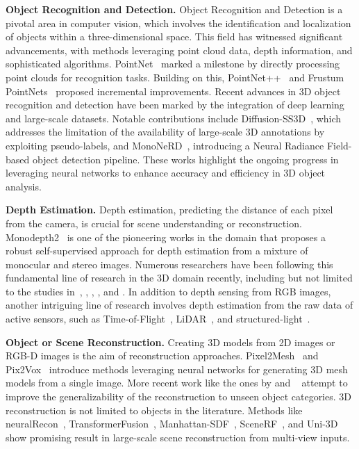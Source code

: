 \vspace{1ex}
\noindent\textbf{Object Recognition and Detection.} Object Recognition and Detection is a pivotal area in computer vision, which involves the identification and localization of objects within a three-dimensional space. This field has witnessed significant advancements, with methods leveraging point cloud data, depth information, and sophisticated algorithms. PointNet~\citep{qi2017pointnet} marked a milestone by directly processing point clouds for recognition tasks. Building on this, PointNet++~\citep{qi2017pointnet++} and Frustum PointNets~\citep{qi2018frustum} proposed incremental improvements. Recent advances in 3D object recognition and detection have been marked by the integration of deep learning and large-scale datasets. Notable contributions include Diffusion-SS3D~\citep{ho2023diffusion}, which addresses the limitation of the availability of large-scale 3D annotations by exploiting pseudo-labels, and MonoNeRD~\citep{xu2023mononerd}, introducing a Neural Radiance Field-based object detection pipeline. These works highlight the ongoing progress in leveraging neural networks to enhance accuracy and efficiency in 3D object analysis.

\vspace{1ex}
\noindent\textbf{Depth Estimation.} Depth estimation, predicting the distance of each pixel from the camera, is crucial for scene understanding or reconstruction. Monodepth2~\citep{godard2019digging} is one of the pioneering works in the domain that proposes a robust self-supervised approach for depth estimation from a mixture of monocular and stereo images. Numerous researchers have been following this fundamental line of research in the 3D domain recently, including but not limited to the studies in~\cite{zhao2023gasmono}, \cite{shao2023nddepth}, \cite{yang2023gedepth}, \cite{zhou2023two}, and \cite{piccinelli2023idisc}. In addition to depth sensing from RGB images, another intriguing line of research involves depth estimation from the raw data of active sensors, such as Time-of-Flight~\citep{li2022deltar}, LiDAR~\citep{bartoccioni2023lidartouch}, and structured-light~\citep{riegler2019connecting}.

\vspace{1ex}
\noindent\textbf{Object or Scene Reconstruction.} Creating 3D models from 2D images or RGB-D images is the aim of reconstruction approaches. Pixel2Mesh~\citep{wang2018pixel2mesh} and Pix2Vox~\citep{xie2019pix2vox} introduce methods leveraging neural networks for generating 3D mesh models from a single image. More recent work like the ones by \cite{yang2023single} and ~\cite{zhang2022monocular} attempt to improve the generalizability of the reconstruction to unseen object categories. 3D reconstruction is not limited to objects in the literature. Methods like neuralRecon~\citep{sun2021neuralrecon}, TransformerFusion~\citep{bozic2021transformerfusion}, Manhattan-SDF~\citep{guo2022neural}, SceneRF~\citep{cao2023scenerf}, and Uni-3D~\citep{zhang2023uni} show promising result in large-scale scene reconstruction from multi-view inputs.

